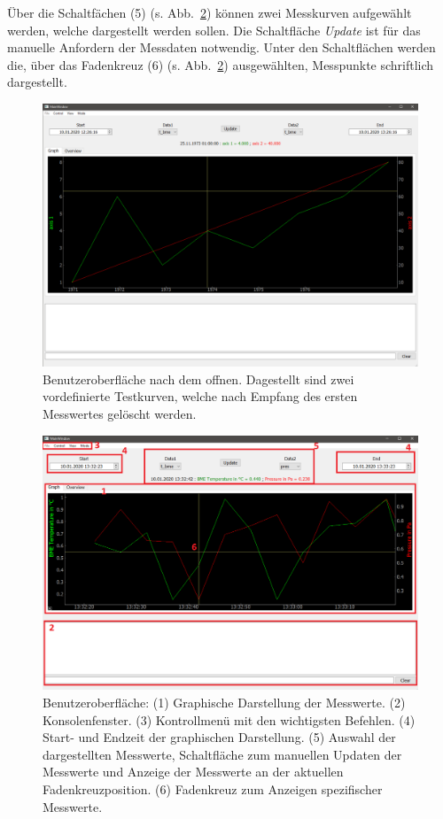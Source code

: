 Über die Schaltfächen (5) (s. Abb.~\ref{fig:ui_graph}) können zwei Messkurven aufgewählt werden, welche dargestellt werden sollen. Die Schaltfläche \emph{Update} ist für das manuelle Anfordern der Messdaten notwendig. Unter den Schaltflächen werden die, über das Fadenkreuz (6) (s. Abb.~\ref{fig:ui_graph}) ausgewählten, Messpunkte schriftlich dargestellt.
\begin{figure}[H]
  \centering
  \includegraphics[width=\textwidth]{./img/ui_open}
  \caption{Benutzeroberfläche nach dem offnen. Dagestellt sind zwei vordefinierte Testkurven, welche nach Empfang des ersten Messwertes gelöscht werden.}\label{fig:ui_open}
\end{figure}
\begin{figure}[H]
  \centering
  \includegraphics[width=\textwidth]{./img/ui_simulated_graph}
  \caption{Benutzeroberfläche: (1) Graphische Darstellung der Messwerte. (2) Konsolenfenster. (3) Kontrollmenü mit den wichtigsten Befehlen. (4) Start- und Endzeit der graphischen Darstellung. (5) Auswahl der dargestellten Messwerte, Schaltfläche zum manuellen Updaten der Messwerte und Anzeige der Messwerte an der aktuellen Fadenkreuzposition. (6) Fadenkreuz zum Anzeigen spezifischer Messwerte.}\label{fig:ui_graph}
\end{figure}
